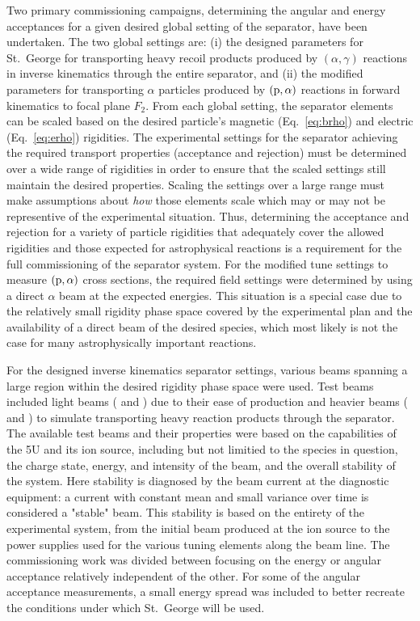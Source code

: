 Two primary commissioning campaigns, determining the angular and energy
acceptances for a given desired global setting of the separator, have been
undertaken. The two global settings are: (i) the designed parameters for St.\
George for transporting heavy recoil products produced by $(\alpha,\gamma)$
reactions in inverse kinematics through the entire separator, and (ii) the
modified parameters for transporting $\alpha$ particles produced by
$({\rm p},\alpha)$ reactions in forward kinematics to focal plane $F_2$.
From each global setting, the separator elements can be scaled based on the
desired particle's magnetic (Eq.~\ref{eq:brho}) and electric
(Eq.~\ref{eq:erho}) rigidities.
The experimental settings for the separator achieving the required transport
properties (acceptance and rejection) must be determined over a wide range of
rigidities in order to ensure that the scaled settings still maintain the
desired properties. Scaling the settings over a large range must make
assumptions about \emph{how} those elements scale which may or may not be
representive of the experimental situation. Thus, determining the acceptance
and rejection for a variety of particle rigidities that adequately cover the
allowed rigidities and those expected for astrophysical reactions is a
requirement for the full commissioning of the separator system. For the
modified tune settings to measure $({\rm p},\alpha)$ cross sections, the
required field settings were determined by using a direct $\alpha$ beam at
the expected energies. This situation is a special case due to the relatively
small rigidity phase space covered by the experimental plan and the
availability of a direct beam of the desired species, which most likely is not
the case for many astrophysically important reactions.

For the designed inverse kinematics separator settings, various beams spanning
a large region within the desired rigidity phase space were used. Test beams
included light beams (\nuc{1}{H} and \nuc{4}{He}) due to their ease of
production and heavier beams (\nuc{16}{O} and \nuc{20}{Ne}) to simulate
transporting heavy reaction products through the separator. The available
test beams and their properties were based on the capabilities of the 5U and
its ion source, including but not limitied to the species in question, the
charge state, energy, and intensity of the beam, and the overall stability
of the system. Here stability is diagnosed by the beam current at the
diagnostic equipment: a current with constant mean and small variance over
time is considered a "stable" beam. This stability is based on the entirety
of the experimental system, from the initial beam produced at the ion source
to the power supplies used for the various tuning elements along the beam
line. The commissioning
work was divided between focusing on the energy or angular acceptance
relatively independent of the other. For some of the angular acceptance
measurements, a small energy spread was included to better recreate the
conditions under which St.\ George will be used.


